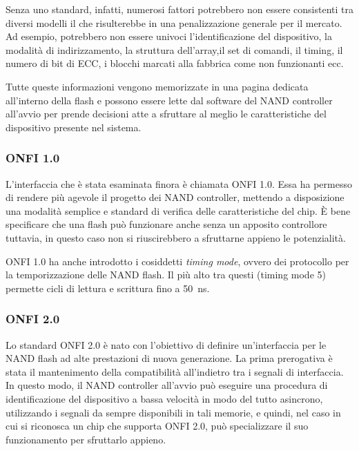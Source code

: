 \documentclass[11pt,4paper]{report}
\begin{document}
Senza uno standard, infatti, numerosi fattori potrebbero non essere consistenti tra diversi modelli il che risulterebbe in una penalizzazione generale per il mercato. Ad esempio, potrebbero non essere univoci l'identificazione del dispositivo, la modalità di indirizzamento, la struttura dell'array,il set di comandi, il timing, il numero di bit di ECC, i blocchi marcati alla fabbrica come non funzionanti ecc.

Tutte queste informazioni vengono memorizzate in una pagina dedicata all'interno della flash e possono essere lette dal software del NAND controller all'avvio per prende decisioni atte a sfruttare al meglio le caratteristiche del dispositivo presente nel sistema.

\subsubsection{ONFI 1.0}
L'interfaccia che è stata esaminata finora è chiamata ONFI 1.0. Essa ha permesso di rendere più agevole il progetto dei NAND controller, mettendo a disposizione una modalità semplice e standard di verifica delle caratteristiche del chip. È bene specificare che una flash può funzionare anche senza un apposito controllore tuttavia, in questo caso non si riuscirebbero a sfruttarne appieno le potenzialità.

ONFI 1.0 ha anche introdotto i cosiddetti \emph{timing mode}, ovvero dei protocollo per la temporizzazione delle NAND flash. Il più alto tra questi (timing mode 5) permette cicli di lettura e scrittura fino a \SI{50}{\nano\second}. 

\subsubsection{ONFI 2.0}
Lo standard ONFI 2.0 è nato con l'obiettivo di definire un'interfaccia per le NAND flash ad alte prestazioni di nuova generazione. La prima prerogativa è stata il mantenimento della compatibilità all'indietro tra i segnali di interfaccia. In questo modo, il NAND controller all'avvio può eseguire una procedura di identificazione del dispositivo a bassa velocità in modo del tutto asincrono, utilizzando i segnali da sempre disponibili in tali memorie, e quindi, nel caso in cui si riconosca un chip che supporta ONFI 2.0, può specializzare il suo funzionamento per sfruttarlo appieno.
\end{document}
